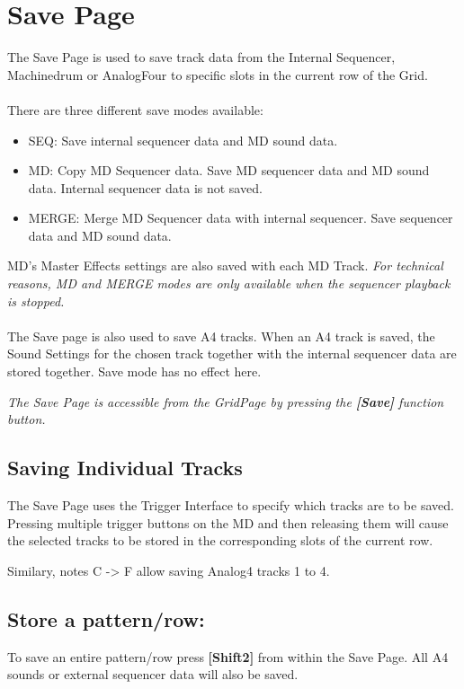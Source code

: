 \chapter{Save Page}

The Save Page is used to save track data from the Internal Sequencer, Machinedrum or AnalogFour to  specific slots in the current row of the Grid.\\
\\
There are three different save modes available:
\begin{itemize}
    \item SEQ: Save internal sequencer data and MD sound data.
    \item MD: Copy MD Sequencer data. Save MD sequencer data and MD sound data. Internal sequencer data is not saved.
    \item MERGE: Merge MD Sequencer data with internal sequencer. Save sequencer data and MD sound data.
\end{itemize}
MD's Master Effects settings are also saved with each MD Track.
\textit{For technical reasons, MD and MERGE modes are only available when the sequencer playback is stopped.}
\\
\\The Save page is also used to save A4 tracks. When an A4 track is saved, the Sound Settings for the chosen track together with the internal sequencer data are stored together. Save mode has no effect here.



\textit{The Save Page is accessible from the GridPage by pressing the  \textbf{[Save]} function button.}


\section{Saving Individual Tracks}
The Save Page uses the Trigger Interface to specify which tracks are to be saved. Pressing multiple trigger buttons on the MD and then releasing them will cause the selected tracks to be stored in the corresponding slots of the current row.

Similary, notes C -> F allow saving Analog4 tracks 1 to 4.
\section{Store a pattern/row:}
To save an entire pattern/row press \textbf{[Shift2]} from within the Save Page. All A4 sounds or external sequencer data will also be saved.



